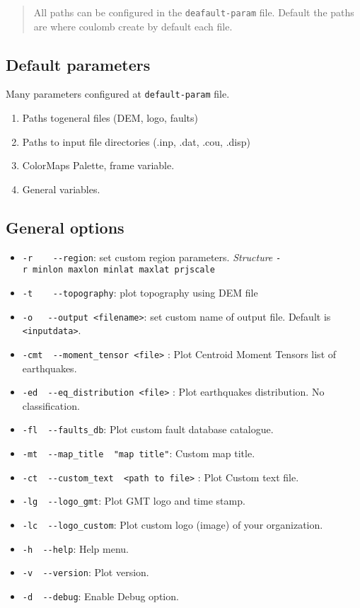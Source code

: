 \begin{quote}
All paths can be configured in the \texttt{deafault-param} file. Default
the paths are where coulomb create by default each file.
\end{quote}

\subsection{Default parameters}\label{default-parameters}

Many parameters configured at \texttt{default-param} file. 
\begin{enumerate}
\item  Paths togeneral files (DEM, logo, faults) 
\item Paths to input file directories (.inp, .dat, .cou, .disp) 
\item ColorMaps Palette, frame variable. 
\item General variables.
\end{enumerate}

\subsection{General options}\label{general-options}

\begin{itemize}
\item
  \texttt{-r\ \ \ \textbar{}\ -\/-region}: set custom region parameters.
  \emph{Structure} \texttt{-r\ minlon\ maxlon\ minlat\ maxlat\ prjscale}
\item
  \texttt{-t\ \ \ \textbar{}\ -\/-topography}: plot topography using DEM
  file
\item
  \texttt{-o\ \ \textbar{}\ -\/-output\ \textless{}filename\textgreater{}}:
  set custom name of output file. Default is
  \texttt{\textless{}inputdata\textgreater{}}.
\item
  \texttt{-cmt\ \textbar{}\ -\/-moment\_tensor\ \textless{}file\textgreater{}}
  : Plot Centroid Moment Tensors list of earthquakes.
\item
  \texttt{-ed\ \textbar{}\ -\/-eq\_distribution\ \textless{}file\textgreater{}}
  : Plot earthquakes distribution. No classification.
\item
  \texttt{-fl\ \textbar{}\ -\/-faults\_db}: Plot custom fault database
  catalogue.
\item
  \texttt{-mt\ \textbar{}\ -\/-map\_title\ \ "map\ title"}: Custom map
  title.
\item
  \texttt{-ct\ \textbar{}\ -\/-custom\_text\ \ \textless{}path\ to\ file\textgreater{}}
  : Plot Custom text file.
\item
  \texttt{-lg\ \textbar{}\ -\/-logo\_gmt}: Plot GMT logo and time stamp.
\item
  \texttt{-lc\ \textbar{}\ -\/-logo\_custom}: Plot custom logo (image)
  of your organization.
\item
  \texttt{-h\ \textbar{}\ -\/-help}: Help menu.
\item
  \texttt{-v\ \textbar{}\ -\/-version}: Plot version.
\item
  \texttt{-d\ \textbar{}\ -\/-debug}: Enable Debug option.
\end{itemize}

